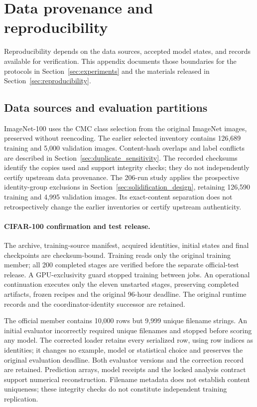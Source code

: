 \documentclass[10pt,a4paper,twocolumn]{article}
\begin{document}
\section{Data provenance and reproducibility}
\label{app:provenance}

Reproducibility depends on the data sources, accepted model states, and
records available for verification. This appendix documents those
boundaries for the protocols in Section~\ref{sec:experiments} and the
materials released in Section~\ref{sec:reproducibility}.

\subsection{Data sources and evaluation partitions}
\label{app:data_sources}

ImageNet-100 uses the CMC class selection from the original ImageNet
images, preserved without reencoding. The earlier selected inventory contains
126,689 training and 5,000 validation images. Content-hash overlaps and
label conflicts are described in Section~\ref{sec:duplicate_sensitivity}.
The recorded checksums identify the copies used and support integrity
checks; they do not independently certify upstream data provenance.
The 206-run study applies the prospective identity-group exclusions
in Section~\ref{sec:solidification_design}, retaining 126,590 training
and 4,995 validation images. Its exact-content separation does not
retrospectively change the earlier inventories or certify upstream
authenticity.

\paragraph{CIFAR-100 confirmation and test release.}
The archive, training-source manifest, acquired identities, initial
states and final checkpoints are checksum-bound. Training reads only
the original training member; all 200 completed stages are verified
before the separate official-test release. A GPU-exclusivity guard
stopped training between jobs. An operational continuation executes only
the eleven unstarted stages, preserving completed artifacts, frozen
recipes and the original 96-hour deadline. The original runtime records
and the coordinator-identity successor are retained.

The official  member contains 10,000 rows but
9,999 unique filename strings. An initial evaluator incorrectly required
unique filenames and stopped before scoring any model. The corrected
loader retains every serialized row, using row indices as identities;
it changes no example, model or statistical choice and preserves the
original evaluation deadline. Both evaluator versions and the correction
record are retained. Prediction arrays, model receipts and the locked
analysis contract support numerical reconstruction. Filename metadata
does not establish content uniqueness; these integrity checks do not
constitute independent training replication.
\end{document}
